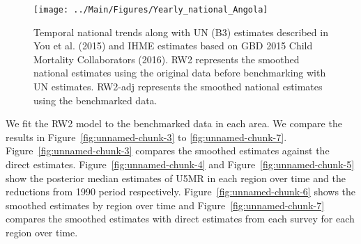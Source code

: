 \documentclass[12pt]{article}\usepackage[]{graphicx}\usepackage[]{color}
\newenvironment{knitrout}{}{} %
\begin{document}
\begin{knitrout}
\color{fgcolor}\begin{figure}[bht]

{\centering \texttt{[image: ../Main/Figures/Yearly\_national\_Angola]} 

}

\caption[Temporal national trends along with UN (B3) estimates described in You et al]{Temporal national trends along with UN (B3) estimates described in You et al. (2015) and IHME estimates based on GBD 2015 Child Mortality Collaborators (2016). RW2 represents the smoothed national estimates using the original data before benchmarking with UN estimates. RW2-adj represents the smoothed national estimates using the benchmarked data.}\label{fig:unnamed-chunk-2}
\end{figure}


\end{knitrout}
 

We fit the RW2 model to the benchmarked data in each area. 
We compare the results in Figure~\ref{fig:unnamed-chunk-3} to \ref{fig:unnamed-chunk-7}.
Figure~\ref{fig:unnamed-chunk-3} compares the smoothed estimates against the direct estimates. Figure~\ref{fig:unnamed-chunk-4} and Figure~\ref{fig:unnamed-chunk-5} show the posterior median estimates of U5MR in each region over time and the reductions from 1990 period respectively.
Figure~\ref{fig:unnamed-chunk-6} shows the smoothed estimates by region over time and Figure~\ref{fig:unnamed-chunk-7} compares the smoothed estimates with direct estimates from each survey for each region over time.




\end{document}
